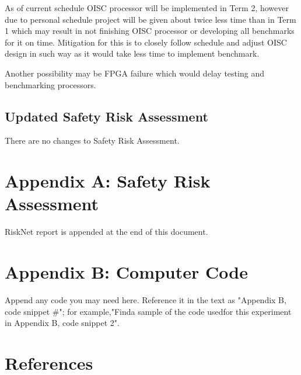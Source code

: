 \documentclass[a4paper,12pt]{article}
\begin{document}
\begin{multicols}{2}
As of current schedule OISC processor will be implemented in Term 2, however due to personal schedule project will be given about twice less time than in Term 1 which may result in not finishing OISC processor or developing all benchmarks for it on time. Mitigation for this is to closely follow schedule and adjust OISC design in such way as it would take less time to implement benchmark.

Another possibility may be FPGA failure which would delay testing and benchmarking processors.

\subsection{Updated Safety Risk Assessment}
There are no changes to Safety Risk Assessment.

\end{multicols}

\section{Appendix A: Safety Risk Assessment}
RiskNet report is appended at the end of this document.

\section{Appendix B: Computer Code}
Append any code you may need here. Reference it in the text as "Appendix B, code snippet \#"; for example,"Finda sample of the code usedfor this experiment in Appendix B, code snippet 2".

\section{References}
\printbibliography


\end{document}
